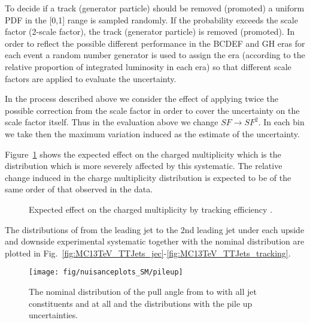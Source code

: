 \begin{description}
To decide if a track (generator particle) should be removed (promoted) a uniform PDF in the [0,1] range is sampled randomly. If the probability exceeds the scale factor (2-scale factor), the track (generator particle) is removed (promoted). In order to reflect the possible different performance in the BCDEF and GH eras for each event a random number generator is used to assign the era (according to the relative proportion of integrated luminosity in each era) so that different scale factors are applied to evaluate the uncertainty.

In the process described above we consider the effect of applying twice the possible correction from the scale factor in order to cover the uncertainty on the scale factor itself. Thus in the evaluation above we change $SF\rightarrow SF^2$. In each bin we take then the maximum variation induced as the estimate of the uncertainty. 

Figure~\ref{fig:tkeffsysts} shows the expected effect on the charged multiplicity which is the distribution which is more severely affected by this systematic. The relative change induced in the charge multiplicity distribution is expected to be of the same order of that observed in the data.

\begin{figure}[!htp]
\centering
{}\hfil
{}
\caption{Expected effect on the charged multiplicity by tracking efficiency \cite{CMS-AN-2017-175}.}
\label{fig:tkeffsysts}
\end{figure}

The distributions of \pullangle from the leading jet \leadingjet to the 2nd leading jet \scndleadingjet under each upside and downside experimental systematic together with the nominal distribution are plotted in Fig.~\ref{fig:MC13TeV_TTJets_jec}-\ref{fig:MC13TeV_TTJets_tracking}.

\begin{figure}[hbtp]
\centering
\def\twidth{0.45}
\texttt{[image: fig/nuisanceplots\_SM/pileup]}
\caption{The nominal distribution of the pull angle from \leadingjet to \scndleadingjet with all jet constituents and at all \DeltaR and the distributions with the pile up uncertainties.}
\label{fig:pileup}
\end{figure}


\end{description}

